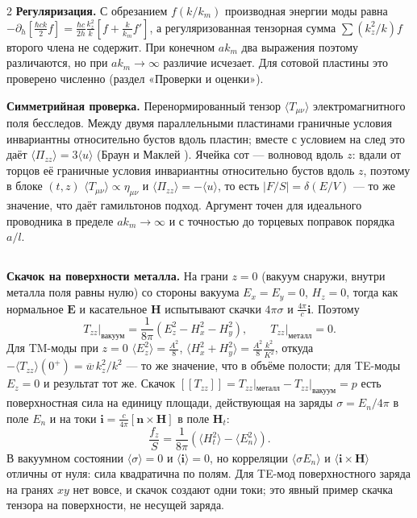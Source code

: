 \documentclass[twoside, 10pt]{article}
\def\myvspacebeforesubsection{-2.0mm}
\def\myvspaceaftersubsection{-2.5mm}
\begin{document}
\begin{multicols}{2}
\textbf{Регуляризация.} С обрезанием \(f(k/k_m)\) производная энергии моды равна
\(-\partial_h\!\left[\frac{\hbar ck}{2}f\right]=\frac{\hbar c}{2h}\frac{k_z^2}{k}\left[f+\frac{k}{k_m}f'\right]\),
а регуляризованная тензорная сумма \(\sum(k_z^2/k)f\) второго члена не содержит. При конечном
\(ak_m\) два выражения поэтому различаются, но при \(ak_m\to\infty\) различие исчезает. Для
сотовой пластины это проверено численно (раздел «Проверки и оценки»).

\textbf{Симметрийная проверка.} Перенормированный тензор \(\langle T_{\mu\nu}\rangle\)
электромагнитного поля бесследов. Между двумя параллельными пластинами граничные условия
инвариантны относительно бустов вдоль пластин; вместе с условием на след это даёт
\(\langle\Pi_{zz}\rangle=3\langle u\rangle\) (Браун и Маклей \cite{BrownMaclay1969}). Ячейка сот ---
волновод вдоль \(z\): вдали от торцов её граничные условия инвариантны относительно бустов вдоль
\(z\), поэтому в блоке \((t,z)\) \(\langle T_{\mu\nu}\rangle\propto\eta_{\mu\nu}\) и
\(\langle\Pi_{zz}\rangle=-\langle u\rangle\), то есть \(|F/S|=\delta(E/V)\) --- то же значение,
что даёт гамильтонов подход. Аргумент точен для идеального проводника в пределе \(ak_m\to\infty\)
и с точностью до торцевых поправок порядка \(a/l\).

\vspace{\myvspacebeforesubsection}
\subsection*{}
\vspace{\myvspaceaftersubsection}


\textbf{Скачок на поверхности металла.} На грани \(z=0\) (вакуум снаружи, внутри металла поля
равны нулю) со стороны вакуума \(E_x=E_y=0\), \(H_z=0\), тогда как нормальное \(\mathbf E\) и
касательное \(\mathbf H\) испытывают скачки \(4\pi\sigma\) и \(\frac{4\pi}{c}\mathbf i\). Поэтому
\[
T_{zz}\big|_{\text{вакуум}}=\frac1{8\pi}\left(E_z^2-H_x^2-H_y^2\right),\qquad
T_{zz}\big|_{\text{металл}}=0 .
\]
Для TM-моды при \(z=0\) \(\langle E_z^2\rangle=\frac{A^2}{8}\),
\(\langle H_x^2+H_y^2\rangle=\frac{A^2}{8}\frac{k^2}{K^2}\), откуда
\(-\langle T_{zz}\rangle(0^+)=\overline w\,k_z^2/k^2\) --- то же значение, что в объёме полости;
для TE-моды \(E_z=0\) и результат тот же. Скачок
\([\![T_{zz}]\!]=T_{zz}|_{\text{металл}}-T_{zz}|_{\text{вакуум}}=p\) есть поверхностная сила на
единицу площади, действующая на заряды \(\sigma=E_n/4\pi\) в поле \(E_n\) и на токи
\(\mathbf i=\frac{c}{4\pi}[\mathbf n\times\mathbf H]\) в поле \(\mathbf H_t\):
\[
\frac{f_z}{S}=\frac1{8\pi}\left(\langle H_t^2\rangle-\langle E_n^2\rangle\right).
\]
В вакуумном состоянии \(\langle\sigma\rangle=0\) и \(\langle\mathbf i\rangle=0\), но корреляции
\(\langle\sigma E_n\rangle\) и \(\langle\mathbf i\times\mathbf H\rangle\) отличны от нуля: сила
квадратична по полям. Для TE-мод поверхностного заряда на гранях \(xy\) нет вовсе, и скачок
создают одни токи; это явный пример скачка тензора на поверхности, не несущей заряда.


\end{multicols}
\end{document}
